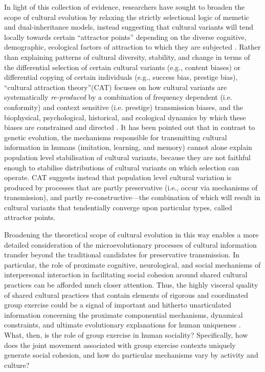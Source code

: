 In light of this collection of evidence, researchers have sought to broaden the scope of cultural evolution by relaxing the strictly selectional logic of memetic and dual-inheritance models, instead suggesting that cultural variants will tend locally towards certain ``attractor points'' depending on the diverse cognitive, demographic, ecological factors of attraction to which they are subjected \citep{Sperber1996}.  Rather than explaining patterns of cultural diversity, stability, and change in terms of the differential selection of certain cultural variants (e.g., content biases) or differential copying of certain individuals (e.g., success bias, prestige bias),  ``cultural attraction theory''(CAT) focuses on how cultural variants are systematically \textit{re-produced} by a combination of frequency dependent (i.e. conformity) and context sensitive (i.e. prestige) transmission biases, and the biophysical, psychological, historical, and ecological dynamics by which these biases are constrained and directed \citep{Claidiere2014}.  It has been pointed out that in contrast to genetic evolution, the mechanisms responsible for transmitting cultural information in humans (imitation, learning, and memory) cannot alone explain population level stabilisation of cultural variants, because they are not faithful enough to stabilise distributions of cultural variants on which selection can operate\cite{Claidiere2014}. CAT suggests instead that population level cultural variation is produced by processes that are partly preservative (i.e., occur via mechanisms of transmission), and partly re-constructive---the combination of which will result in cultural variants that tendentially converge upon particular types, called attractor points.

Broadening the theoretical scope of cultural evolution in this way enables a more detailed consideration of the microevolutionary processes of cultural information transfer beyond the traditional candidates for preservative transmission. In particular, the role of proximate cognitive, neurological, and social mechanisms of interpersonal interaction in facilitating social cohesion around shared cultural practices can be afforded much closer attention.  Thus, the highly visceral quality of shared cultural practices that contain elements of rigorous and coordinated group exercise could be a signal of important and hitherto unarticulated information concerning the proximate componential mechanisms, dynamical constraints, and ultimate evolutionary explanations for human uniqueness \citep[3]{Claidiere2014}.  What, then, is the role of group exercise in human sociality? Specifically, how does the joint movement associated with group exercise contexts uniquely generate social cohesion, and how do particular mechanisms vary by activity and culture?

